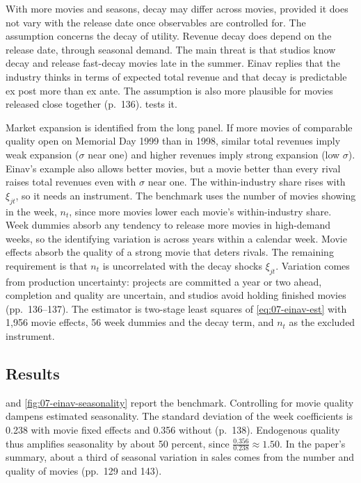 With more movies and seasons, decay may differ across movies, provided it does not vary with the release date
once observables are controlled for. The assumption concerns the decay of utility. Revenue decay does depend on
the release date, through seasonal demand. The main
threat is that studios know decay and release fast-decay movies late in the summer. Einav replies that the
industry thinks in terms of expected total revenue and that decay is predictable ex post more than ex ante. The
assumption is also more plausible for movies released close together (p.~136).  tests it.

Market expansion is identified from the long panel. If more movies of comparable quality open on Memorial Day 1999
than in 1998, similar total revenues imply weak expansion ($\sigma$ near one) and higher revenues imply strong
expansion (low $\sigma$). Einav's example also allows better movies, but a movie better than every rival raises
total revenues even with $\sigma$ near one. The within-industry share rises with $\xi_{jt}$, so it needs an instrument. The benchmark uses the
number of movies showing in the week, $n_t$, since more movies lower each movie's within-industry share. Week
dummies absorb any tendency to release more movies in high-demand weeks, so the identifying variation is across
years within a calendar week. Movie effects absorb the quality of a strong movie that deters rivals. The remaining
requirement is that $n_t$ is uncorrelated with the decay shocks $\xi_{jt}$. Variation comes from production
uncertainty: projects are committed a year or two ahead, completion and quality are uncertain, and studios avoid
holding finished movies (pp.~136--137). The estimator is two-stage least squares of \eqref{eq:07-einav-est} with
1,956 movie effects, 56 week dummies and the decay term, and $n_t$ as the excluded instrument.

\subsection{Results}\label{sec:07-einav-results}

 and \cref{fig:07-einav-seasonality} report the benchmark. Controlling for movie
quality dampens estimated seasonality. The standard deviation of the week coefficients is 0.238 with movie fixed
effects and 0.356 without (p.~138). Endogenous quality thus amplifies seasonality by about 50 percent, since
$\frac{0.356}{0.238} \approx 1.50$. In the paper's summary, about a third of seasonal variation in sales comes
from the number and quality of movies (pp.~129 and 143).

